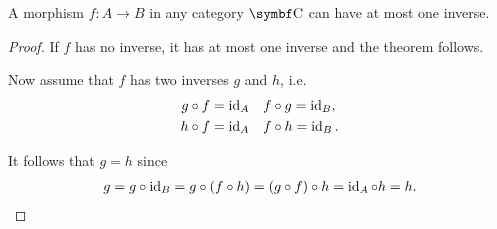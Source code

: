 \begin{proposition}\label{thm:at_most_one_isomorphism}\cite[exercise 1.1.13]{Leinster2014}
  A morphism \( f: A \to B \) in any category \( \Cat{C} \) can have at most one inverse.
\end{proposition}
\begin{proof}
  If \( f \) has no inverse, it has at most one inverse and the theorem follows.

  Now assume that \( f \) has two inverses \( g \) and \( h \), i.e.
  \begin{align*}
    g \circ f = \operatorname{id}_A && &f \circ g = \operatorname{id}_B,
    \\
    h \circ f = \operatorname{id}_A && &f \circ h = \operatorname{id}_B.
  \end{align*}

  It follows that \( g = h \) since
  \begin{align*}
    g
    =
    g \circ \operatorname{id}_B
    =
    g \circ (f \circ h)
    =
    (g \circ f) \circ h
    =
    \operatorname{id}_A \circ h
    =
    h.
  \end{align*}
\end{proof}

